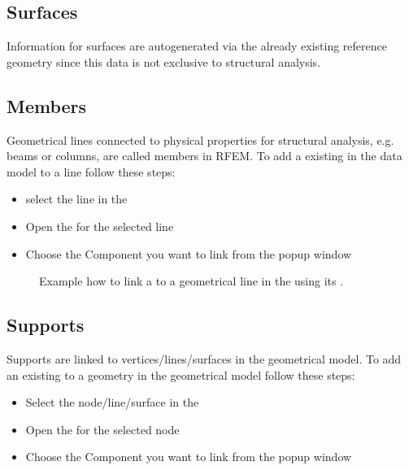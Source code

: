 \documentclass[letterpaper,10pt,english]{jupyterBook}
\let\sphinxpxdimen\pdfpxdimen\else\newdimen\sphinxpxdimen
\begin{document}
\subsection{Surfaces}
\label{\detokenize{Setting_up_a_problem:surfaces}}
\sphinxAtStartPar
Information for surfaces are autogenerated via the already existing reference geometry since this data is not exclusive
to structural analysis.


\subsection{Members}
\label{\detokenize{Setting_up_a_problem:members}}
\sphinxAtStartPar
Geometrical lines connected to physical properties for structural analysis, e.g. beams or columns, are called members in
RFEM. To add a  existing in the data model to a line follow these steps:
\begin{itemize}
\item {} 
\sphinxAtStartPar
select the line in the 

\item {} 
\sphinxAtStartPar
Open the  for the selected line

\item {} 
\sphinxAtStartPar
Choose the Component you want to link from the pop\sphinxhyphen{}up window

\end{itemize}

\begin{figure}[htbp]
\centering
\capstart

\noindent\sphinxincludegraphics[height=350\sphinxpxdimen]{{add_member}.png}
\caption{Example how to link a  to a geometrical line in the  using its .}\label{\detokenize{Setting_up_a_problem:add-member}}\end{figure}


\subsection{Supports}
\label{\detokenize{Setting_up_a_problem:supports}}
\sphinxAtStartPar
Supports are linked to vertices/lines/surfaces in the geometrical model. To add an existing  to a
geometry in the geometrical model follow these steps:
\begin{itemize}
\item {} 
\sphinxAtStartPar
Select the node/line/surface in the 

\item {} 
\sphinxAtStartPar
Open the  for the selected node

\item {} 
\sphinxAtStartPar
Choose the Component you want to link from the pop\sphinxhyphen{}up window

\end{itemize}
\end{document}
